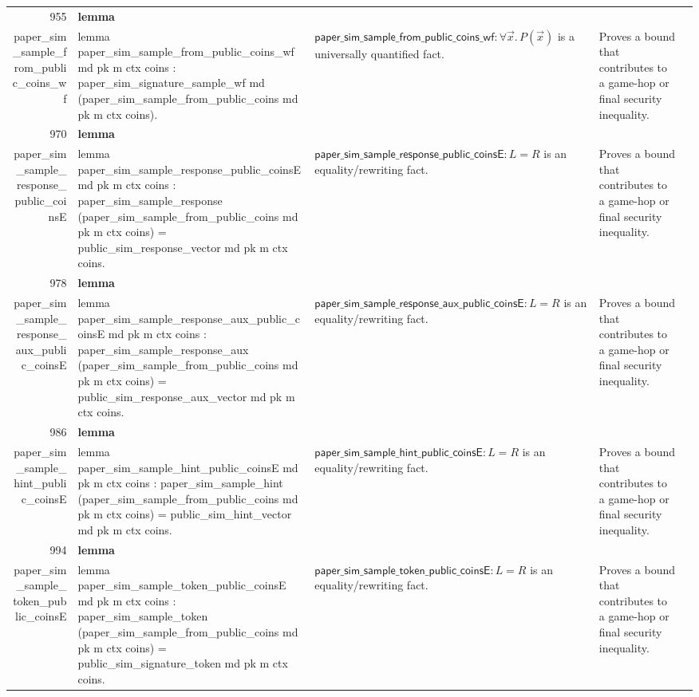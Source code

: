 \documentclass[10pt]{article}
\newcommand{\ec}[1]{\begingroup\ttfamily\scriptsize #1\endgroup}
\begin{document}
\begin{longtable}{r L{0.17\textwidth} L{0.26\textwidth} L{0.27\textwidth} L{0.20\textwidth}}
955 & \textbf{lemma}\\\ec{paper\_sim\_sample\_from\_public\_coins\_wf} & \ec{lemma paper\_sim\_sample\_from\_public\_coins\_wf md pk m ctx coins : paper\_sim\_signature\_sample\_wf md (paper\_sim\_sample\_from\_public\_coins md pk m ctx coins).} & \(\mathsf{paper\_sim\_sample\_from\_public\_coins\_wf} : \forall \vec{x}.\, P(\vec{x})\) is a universally quantified fact. & Proves a bound that contributes to a game-hop or final security inequality. \\
970 & \textbf{lemma}\\\ec{paper\_sim\_sample\_response\_public\_coinsE} & \ec{lemma paper\_sim\_sample\_response\_public\_coinsE md pk m ctx coins : paper\_sim\_sample\_response (paper\_sim\_sample\_from\_public\_coins md pk m ctx coins) = public\_sim\_response\_vector md pk m ctx coins.} & \(\mathsf{paper\_sim\_sample\_response\_public\_coinsE} : L = R\) is an equality/rewriting fact. & Proves a bound that contributes to a game-hop or final security inequality. \\
978 & \textbf{lemma}\\\ec{paper\_sim\_sample\_response\_aux\_public\_coinsE} & \ec{lemma paper\_sim\_sample\_response\_aux\_public\_coinsE md pk m ctx coins : paper\_sim\_sample\_response\_aux (paper\_sim\_sample\_from\_public\_coins md pk m ctx coins) = public\_sim\_response\_aux\_vector md pk m ctx coins.} & \(\mathsf{paper\_sim\_sample\_response\_aux\_public\_coinsE} : L = R\) is an equality/rewriting fact. & Proves a bound that contributes to a game-hop or final security inequality. \\
986 & \textbf{lemma}\\\ec{paper\_sim\_sample\_hint\_public\_coinsE} & \ec{lemma paper\_sim\_sample\_hint\_public\_coinsE md pk m ctx coins : paper\_sim\_sample\_hint (paper\_sim\_sample\_from\_public\_coins md pk m ctx coins) = public\_sim\_hint\_vector md pk m ctx coins.} & \(\mathsf{paper\_sim\_sample\_hint\_public\_coinsE} : L = R\) is an equality/rewriting fact. & Proves a bound that contributes to a game-hop or final security inequality. \\
994 & \textbf{lemma}\\\ec{paper\_sim\_sample\_token\_public\_coinsE} & \ec{lemma paper\_sim\_sample\_token\_public\_coinsE md pk m ctx coins : paper\_sim\_sample\_token (paper\_sim\_sample\_from\_public\_coins md pk m ctx coins) = public\_sim\_signature\_token md pk m ctx coins.} & \(\mathsf{paper\_sim\_sample\_token\_public\_coinsE} : L = R\) is an equality/rewriting fact. & Proves a bound that contributes to a game-hop or final security inequality. \\

\end{longtable}
\end{document}
